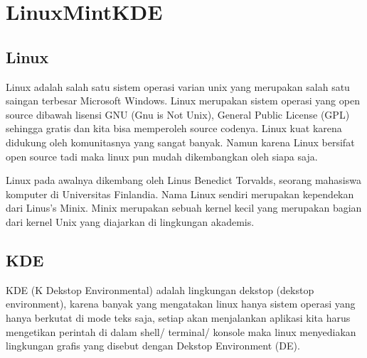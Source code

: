 \documentclass[11pt,fleqn]{book} %
\begin{document}
\newpage
{} %
\chapter{LinuxMintKDE}
\section{Linux}
\begin{justified}
\hspace{10pt}Linux adalah salah satu sistem operasi varian unix yang merupakan salah satu saingan terbesar Microsoft Windows. 
Linux merupakan sistem operasi yang open source dibawah lisensi GNU (Gnu is Not Unix), General Public License (GPL) sehingga gratis dan kita bisa memperoleh source codenya. 
Linux kuat karena didukung oleh komunitasnya yang sangat banyak.
Namun karena Linux bersifat open source tadi maka linux pun mudah dikembangkan oleh siapa saja.

\hspace{10pt}Linux pada awalnya dikembang oleh Linus Benedict Torvalds, seorang mahasiswa komputer di Universitas Finlandia.
Nama Linux sendiri merupakan kependekan dari Linus's Minix.
Minix merupakan sebuah kernel kecil yang merupakan bagian dari kernel Unix yang diajarkan di lingkungan akademis.
\end{justified}
\section{KDE}
\begin{justified}
 \hspace{10pt} KDE (K Dekstop Environmental) adalah lingkungan dekstop (dekstop environment), karena banyak yang mengatakan linux hanya sistem operasi yang hanya berkutat di mode teks saja, setiap akan menjalankan aplikasi kita harus mengetikan perintah di dalam shell/ terminal/ konsole maka linux menyediakan lingkungan grafis yang disebut dengan Dekstop Environment (DE). 
\end{justified}
\end{document}
